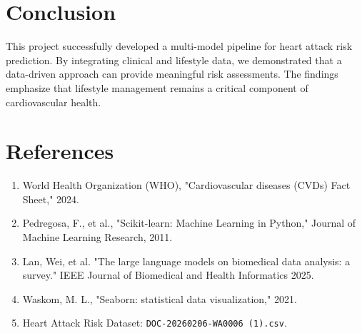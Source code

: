 \documentclass[12pt]{article}
\begin{document}
\section{Conclusion}
This project successfully developed a multi-model pipeline for heart attack risk prediction. By integrating clinical and lifestyle data, we demonstrated that a data-driven approach can provide meaningful risk assessments. The findings emphasize that lifestyle management remains a critical component of cardiovascular health.

\newpage
\section{References}
\begin{enumerate}
    \item World Health Organization (WHO), "Cardiovascular diseases (CVDs) Fact Sheet," 2024.
    \item Pedregosa, F., et al., "Scikit-learn: Machine Learning in Python," Journal of Machine Learning Research, 2011.
    \item Lan, Wei, et al. "The large language models on biomedical data analysis: a survey." IEEE Journal of Biomedical and Health Informatics 2025.
    \item Waskom, M. L., "Seaborn: statistical data visualization," 2021.
    \item Heart Attack Risk Dataset: \texttt{DOC-20260206-WA0006 (1).csv}.
\end{enumerate}
\end{document}
